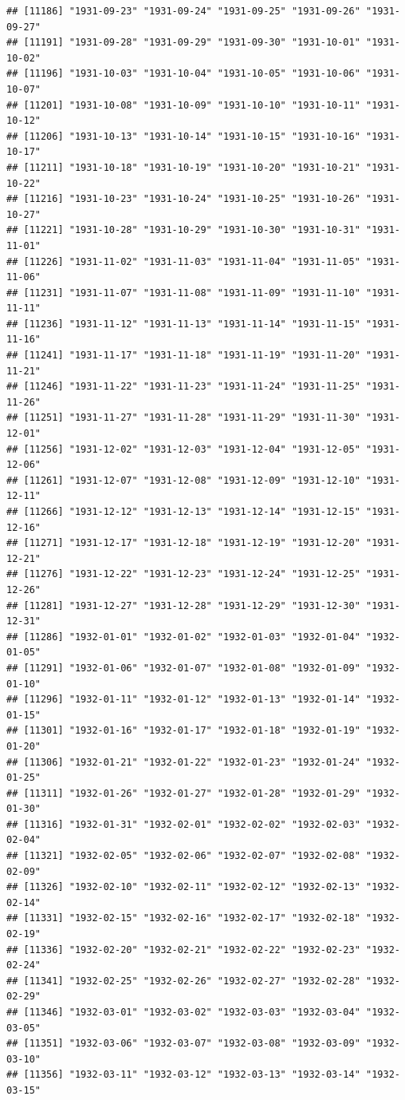 \documentclass{article}\usepackage[]{graphicx}\usepackage[]{color}
\makeatletter
\newenvironment{kframe}{%
 \def\at@end@of@kframe{}%
 \ifinner\ifhmode%
  \def\at@end@of@kframe{\end{minipage}}%
  \begin{minipage}{\columnwidth}%
 \fi\fi%
 \def\FrameCommand##1{\hskip\@totalleftmargin \hskip-\fboxsep
 \colorbox{shadecolor}{##1}\hskip-\fboxsep
     \hskip-\linewidth \hskip-\@totalleftmargin \hskip\columnwidth}%
 \MakeFramed {\advance\hsize-\width
   \@totalleftmargin\z@ \linewidth\hsize
   \@setminipage}}%
 {\par\unskip\endMakeFramed%
 \at@end@of@kframe}
\newenvironment{knitrout}{}{} %
\makeatother
\begin{document}
\begin{description}
\begin{knitrout}
\begin{kframe}
\begin{verbatim}
## [11186] "1931-09-23" "1931-09-24" "1931-09-25" "1931-09-26" "1931-09-27"
## [11191] "1931-09-28" "1931-09-29" "1931-09-30" "1931-10-01" "1931-10-02"
## [11196] "1931-10-03" "1931-10-04" "1931-10-05" "1931-10-06" "1931-10-07"
## [11201] "1931-10-08" "1931-10-09" "1931-10-10" "1931-10-11" "1931-10-12"
## [11206] "1931-10-13" "1931-10-14" "1931-10-15" "1931-10-16" "1931-10-17"
## [11211] "1931-10-18" "1931-10-19" "1931-10-20" "1931-10-21" "1931-10-22"
## [11216] "1931-10-23" "1931-10-24" "1931-10-25" "1931-10-26" "1931-10-27"
## [11221] "1931-10-28" "1931-10-29" "1931-10-30" "1931-10-31" "1931-11-01"
## [11226] "1931-11-02" "1931-11-03" "1931-11-04" "1931-11-05" "1931-11-06"
## [11231] "1931-11-07" "1931-11-08" "1931-11-09" "1931-11-10" "1931-11-11"
## [11236] "1931-11-12" "1931-11-13" "1931-11-14" "1931-11-15" "1931-11-16"
## [11241] "1931-11-17" "1931-11-18" "1931-11-19" "1931-11-20" "1931-11-21"
## [11246] "1931-11-22" "1931-11-23" "1931-11-24" "1931-11-25" "1931-11-26"
## [11251] "1931-11-27" "1931-11-28" "1931-11-29" "1931-11-30" "1931-12-01"
## [11256] "1931-12-02" "1931-12-03" "1931-12-04" "1931-12-05" "1931-12-06"
## [11261] "1931-12-07" "1931-12-08" "1931-12-09" "1931-12-10" "1931-12-11"
## [11266] "1931-12-12" "1931-12-13" "1931-12-14" "1931-12-15" "1931-12-16"
## [11271] "1931-12-17" "1931-12-18" "1931-12-19" "1931-12-20" "1931-12-21"
## [11276] "1931-12-22" "1931-12-23" "1931-12-24" "1931-12-25" "1931-12-26"
## [11281] "1931-12-27" "1931-12-28" "1931-12-29" "1931-12-30" "1931-12-31"
## [11286] "1932-01-01" "1932-01-02" "1932-01-03" "1932-01-04" "1932-01-05"
## [11291] "1932-01-06" "1932-01-07" "1932-01-08" "1932-01-09" "1932-01-10"
## [11296] "1932-01-11" "1932-01-12" "1932-01-13" "1932-01-14" "1932-01-15"
## [11301] "1932-01-16" "1932-01-17" "1932-01-18" "1932-01-19" "1932-01-20"
## [11306] "1932-01-21" "1932-01-22" "1932-01-23" "1932-01-24" "1932-01-25"
## [11311] "1932-01-26" "1932-01-27" "1932-01-28" "1932-01-29" "1932-01-30"
## [11316] "1932-01-31" "1932-02-01" "1932-02-02" "1932-02-03" "1932-02-04"
## [11321] "1932-02-05" "1932-02-06" "1932-02-07" "1932-02-08" "1932-02-09"
## [11326] "1932-02-10" "1932-02-11" "1932-02-12" "1932-02-13" "1932-02-14"
## [11331] "1932-02-15" "1932-02-16" "1932-02-17" "1932-02-18" "1932-02-19"
## [11336] "1932-02-20" "1932-02-21" "1932-02-22" "1932-02-23" "1932-02-24"
## [11341] "1932-02-25" "1932-02-26" "1932-02-27" "1932-02-28" "1932-02-29"
## [11346] "1932-03-01" "1932-03-02" "1932-03-03" "1932-03-04" "1932-03-05"
## [11351] "1932-03-06" "1932-03-07" "1932-03-08" "1932-03-09" "1932-03-10"
## [11356] "1932-03-11" "1932-03-12" "1932-03-13" "1932-03-14" "1932-03-15"

\end{verbatim}
\end{kframe}
\end{knitrout}
\end{description}
\end{document}
